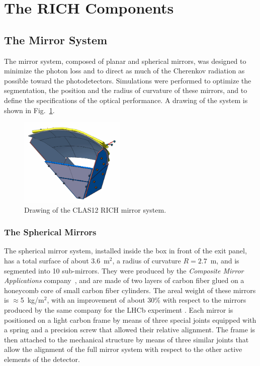 \documentclass[5p,times,twocolumn]{elsarticle}
\begin{document}
\section{The RICH Components}

\subsection{The Mirror System}

The mirror system, composed of planar and spherical mirrors, was designed to minimize the photon loss and to direct
as much of the Cherenkov radiation as possible toward the photodetectors. Simulations were performed to optimize
the segmentation, the position and the radius of curvature of these mirrors, and to define the specifications of the
optical performance. A drawing of the system is shown in Fig.~\ref{Fig:RICHmirrors}.

\begin{figure}
\begin{center}
\includegraphics[width=0.45\textwidth]{RICHmirrors.pdf}
\caption{Drawing of the CLAS12 RICH mirror system.}
\label{Fig:RICHmirrors}
\end{center}
\end{figure}

\subsubsection{The Spherical Mirrors}

The spherical mirror system, installed inside the box in front of the exit panel, has a total surface of about 3.6~m$^2$,
a radius of curvature $R= 2.7$~m, and is segmented into 10 sub-mirrors. They were produced by the {\it Composite
Mirror Applications} company~\cite{REF:CMA}, and are made of two layers of carbon fiber glued on a honeycomb
core of small carbon fiber cylinders. The areal weight of these mirrors is $\approx$5~kg/m$^2$, with an
improvement of about 30\% with respect to the mirrors produced by the same company for the LHCb experiment
\cite{REF:LHCbMirrors}. Each mirror is positioned on a light carbon frame by means of three special joints equipped
with a spring and a precision screw that allowed their relative alignment. The frame is then attached to the mechanical
structure by means of three similar joints that allow the alignment of the full mirror system with respect to the other
active elements of the detector.
\end{document}
